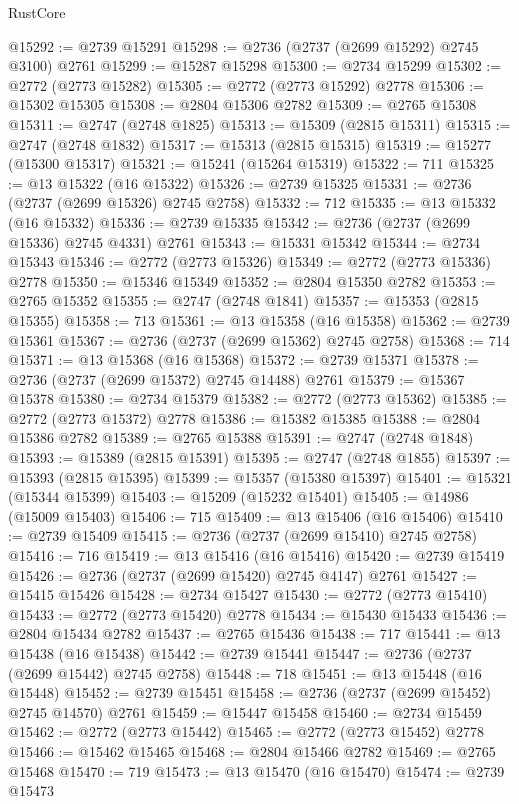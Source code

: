 \begin{lexlean}{RustCore}
\begin{coremodule}
@15292 := @2739 @15291
@15298 := @2736 (@2737 (@2699 @15292) @2745 @3100) @2761
@15299 := @15287 @15298
@15300 := @2734 @15299
@15302 := @2772 (@2773 @15282)
@15305 := @2772 (@2773 @15292) @2778
@15306 := @15302 @15305
@15308 := @2804 @15306 @2782
@15309 := @2765 @15308
@15311 := @2747 (@2748 @1825)
@15313 := @15309 (@2815 @15311)
@15315 := @2747 (@2748 @1832)
@15317 := @15313 (@2815 @15315)
@15319 := @15277 (@15300 @15317)
@15321 := @15241 (@15264 @15319)
@15322 := 711
@15325 := @13 @15322 (@16 @15322)
@15326 := @2739 @15325
@15331 := @2736 (@2737 (@2699 @15326) @2745 @2758)
@15332 := 712
@15335 := @13 @15332 (@16 @15332)
@15336 := @2739 @15335
@15342 := @2736 (@2737 (@2699 @15336) @2745 @4331) @2761
@15343 := @15331 @15342
@15344 := @2734 @15343
@15346 := @2772 (@2773 @15326)
@15349 := @2772 (@2773 @15336) @2778
@15350 := @15346 @15349
@15352 := @2804 @15350 @2782
@15353 := @2765 @15352
@15355 := @2747 (@2748 @1841)
@15357 := @15353 (@2815 @15355)
@15358 := 713
@15361 := @13 @15358 (@16 @15358)
@15362 := @2739 @15361
@15367 := @2736 (@2737 (@2699 @15362) @2745 @2758)
@15368 := 714
@15371 := @13 @15368 (@16 @15368)
@15372 := @2739 @15371
@15378 := @2736 (@2737 (@2699 @15372) @2745 @14488) @2761
@15379 := @15367 @15378
@15380 := @2734 @15379
@15382 := @2772 (@2773 @15362)
@15385 := @2772 (@2773 @15372) @2778
@15386 := @15382 @15385
@15388 := @2804 @15386 @2782
@15389 := @2765 @15388
@15391 := @2747 (@2748 @1848)
@15393 := @15389 (@2815 @15391)
@15395 := @2747 (@2748 @1855)
@15397 := @15393 (@2815 @15395)
@15399 := @15357 (@15380 @15397)
@15401 := @15321 (@15344 @15399)
@15403 := @15209 (@15232 @15401)
@15405 := @14986 (@15009 @15403)
@15406 := 715
@15409 := @13 @15406 (@16 @15406)
@15410 := @2739 @15409
@15415 := @2736 (@2737 (@2699 @15410) @2745 @2758)
@15416 := 716
@15419 := @13 @15416 (@16 @15416)
@15420 := @2739 @15419
@15426 := @2736 (@2737 (@2699 @15420) @2745 @4147) @2761
@15427 := @15415 @15426
@15428 := @2734 @15427
@15430 := @2772 (@2773 @15410)
@15433 := @2772 (@2773 @15420) @2778
@15434 := @15430 @15433
@15436 := @2804 @15434 @2782
@15437 := @2765 @15436
@15438 := 717
@15441 := @13 @15438 (@16 @15438)
@15442 := @2739 @15441
@15447 := @2736 (@2737 (@2699 @15442) @2745 @2758)
@15448 := 718
@15451 := @13 @15448 (@16 @15448)
@15452 := @2739 @15451
@15458 := @2736 (@2737 (@2699 @15452) @2745 @14570) @2761
@15459 := @15447 @15458
@15460 := @2734 @15459
@15462 := @2772 (@2773 @15442)
@15465 := @2772 (@2773 @15452) @2778
@15466 := @15462 @15465
@15468 := @2804 @15466 @2782
@15469 := @2765 @15468
@15470 := 719
@15473 := @13 @15470 (@16 @15470)
@15474 := @2739 @15473

\end{coremodule}
\end{lexlean}
